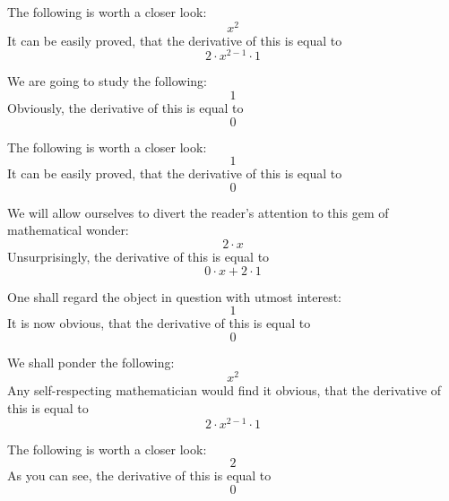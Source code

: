 \documentclass{article}
\begin{document}
The following is worth a closer look:
\begin{equation}
x ^{2 } 
\end{equation}
It can be easily proved, that the derivative of this is equal to
\begin{equation}
2 \cdot x ^{2 - 1 } \cdot 1 
\end{equation}

We are going to study the following:
\begin{equation}
1 
\end{equation}
Obviously, the derivative of this is equal to
\begin{equation}
0 
\end{equation}

The following is worth a closer look:
\begin{equation}
1 
\end{equation}
It can be easily proved, that the derivative of this is equal to
\begin{equation}
0 
\end{equation}

We will allow ourselves to divert the reader's attention to this gem of mathematical wonder:
\begin{equation}
2 \cdot x 
\end{equation}
Unsurprisingly, the derivative of this is equal to
\begin{equation}
0 \cdot x + 2 \cdot 1 
\end{equation}

One shall regard the object in question with utmost interest:
\begin{equation}
1 
\end{equation}
It is now obvious, that the derivative of this is equal to
\begin{equation}
0 
\end{equation}

We shall ponder the following:
\begin{equation}
x ^{2 } 
\end{equation}
Any self-respecting mathematician would find it obvious, that the derivative of this is equal to
\begin{equation}
2 \cdot x ^{2 - 1 } \cdot 1 
\end{equation}

The following is worth a closer look:
\begin{equation}
2 
\end{equation}
As you can see, the derivative of this is equal to
\begin{equation}
0 
\end{equation}
\end{document}
